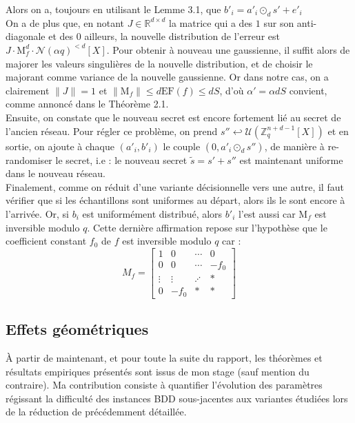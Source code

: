 \documentclass[11pt,a4paper]{article}
\begin{document}
Alors on a, toujours en utilisant le Lemme 3.1, que $b'_i = a'_i \odot_d s' + e'_i$ \\

On a de plus que, en notant $J \in \mathbb{R}^{d\times d}$ la matrice qui a des $1$ sur son anti-diagonale et des $0$ ailleurs, la nouvelle distribution de l'erreur est $J\cdot\text{M}_f^d\cdot \mathcal{N}(\alpha q)^{<d}[X]$. Pour obtenir à nouveau une gaussienne, il suffit alors de majorer les valeurs singulières de la nouvelle distribution, et de choisir le majorant comme variance de la nouvelle gaussienne. Or dans notre cas, on a clairement $\|J\|=1$ et $\|\text{M}_f\| \leq d\text{EF}(f)\leq dS$, d'où $\alpha'=\alpha d S$ convient, comme annoncé dans le Théorème 2.1. \\

Ensuite, on constate que le nouveau secret est encore fortement lié au secret de l'ancien réseau. Pour régler ce problème, on prend $s'' \hookleftarrow \mathcal{U}(\mathbb{Z}_q^{n+d-1}[X])$ et en sortie, on ajoute à chaque $(a'_i,b'_i)$ le couple $(0,a'_i\odot_d s'')$, de manière à re-randomiser le secret, i.e : le nouveau secret $\tilde s = s'+s''$ est maintenant uniforme dans le nouveau réseau.  \\

Finalement, comme on réduit d'une variante décisionnelle vers une autre, il faut vérifier que si les échantillons sont uniformes au départ, alors ils le sont encore à l'arrivée. Or, si $b_i$ est uniformément distribué, alors $b'_i$ l'est aussi car $\text{M}_f$ est inversible modulo $q$. Cette dernière affirmation repose sur l'hypothèse que le coefficient constant $f_0$ de $f$ est inversible modulo $q$ car : 
$$ M_f =\left[\begin{array}{cccc}
1&0&\cdots&0 \\
0& 0 & \cdots & -f_0 \\
\vdots & \vdots &  \iddots &* \\
0 & -f_0 & * &* 
\end{array}\right] $$


\subsection{Effets géométriques}
À partir de maintenant, et pour toute la suite du rapport, les théorèmes et résultats empiriques présentés sont issus de mon stage (sauf mention du contraire). Ma contribution consiste à quantifier l'évolution des paramètres régissant la difficulté des instances BDD sous-jacentes aux variantes étudiées lors de la réduction de \cite{mplwe}	précédemment détaillée. \\
\end{document}
